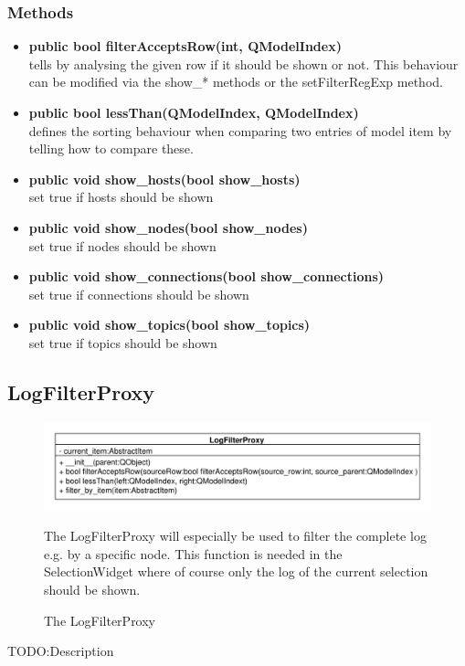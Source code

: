 \subsubsection{Methods}
\begin{itemize}
  \item \textbf{public bool filterAcceptsRow(int, QModelIndex)}\\
  tells by analysing the given row if it should be shown or not. This behaviour can be modified via the show\_* methods or the setFilterRegExp method.
  \item \textbf{public bool lessThan(QModelIndex, QModelIndex)}\\
  defines the sorting behaviour when comparing two entries of model item by telling how to compare these.
  \item \textbf{public void show\_hosts(bool show\_hosts)}\\
  set true if hosts should be shown
  \item \textbf{public void show\_nodes(bool show\_nodes)}\\
  set true if nodes should be shown
  \item \textbf{public void show\_connections(bool show\_connections)}\\
  set true if connections should be shown
  \item \textbf{public void show\_topics(bool show\_topics)}\\
  set true if topics should be shown
\end{itemize}

\subsection{LogFilterProxy}
\begin{figure}[htbp]
	\begin{minipage}[t]{7cm}
		\vspace{0pt}
		\centering
		\includegraphics[scale=0.6]{./diagram_pictures/LogFilter.pdf}
		\caption{The LogFilterProxy}
	\end{minipage}
	\hfill
	\begin{minipage}[t]{8cm}
		\vspace{10pt}
		The LogFilterProxy will especially be used to filter the complete log e.g. by a specific node. This function is needed in the SelectionWidget where of course only the log of the current selection should be shown.
	\end{minipage}
\end{figure} 
TODO:Description	

